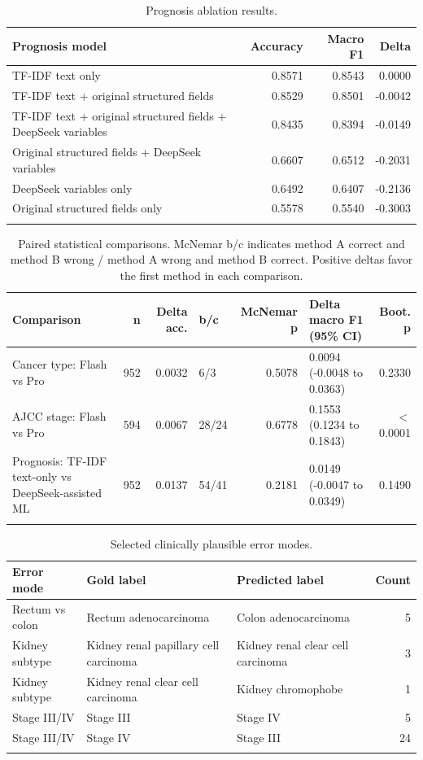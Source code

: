 \documentclass[pdflatex,sn-vancouver-num]{sn-jnl}
\begin{document}
\begin{table}[htbp]
\caption{Prognosis ablation results.}\label{tab:prognosis}
\small
\begin{tabular}{@{}p{7.0cm}r r r@{}}
\toprule
Prognosis model & Accuracy & Macro F1 & Delta \\
\midrule
TF-IDF text only & 0.8571 & 0.8543 & 0.0000 \\
TF-IDF text + original structured fields & 0.8529 & 0.8501 & -0.0042 \\
TF-IDF text + original structured fields + DeepSeek variables & 0.8435 & 0.8394 & -0.0149 \\
Original structured fields + DeepSeek variables & 0.6607 & 0.6512 & -0.2031 \\
DeepSeek variables only & 0.6492 & 0.6407 & -0.2136 \\
Original structured fields only & 0.5578 & 0.5540 & -0.3003 \\
\botrule
\end{tabular}
\end{table}

\begin{table}[htbp]
\caption{Paired statistical comparisons. McNemar b/c indicates method A correct and method B wrong / method A wrong and method B correct. Positive deltas favor the first method in each comparison.}\label{tab:paired}
\small
\begin{tabular}{@{}p{4.8cm}r r p{1.5cm}r p{3.0cm}r@{}}
\toprule
Comparison & n & Delta acc. & b/c & McNemar p & Delta macro F1 (95\% CI) & Boot. p \\
\midrule
Cancer type: Flash vs Pro & 952 & 0.0032 & 6/3 & 0.5078 & 0.0094 (-0.0048 to 0.0363) & 0.2330 \\
AJCC stage: Flash vs Pro & 594 & 0.0067 & 28/24 & 0.6778 & 0.1553 (0.1234 to 0.1843) & $<$0.0001 \\
Prognosis: TF-IDF text-only vs DeepSeek-assisted ML & 952 & 0.0137 & 54/41 & 0.2181 & 0.0149 (-0.0047 to 0.0349) & 0.1490 \\
\botrule
\end{tabular}
\end{table}

\begin{table}[htbp]
\caption{Selected clinically plausible error modes.}\label{tab:errors}
\small
\begin{tabular}{@{}p{3.4cm}p{3.7cm}p{3.7cm}r@{}}
\toprule
Error mode & Gold label & Predicted label & Count \\
\midrule
Rectum vs colon & Rectum adenocarcinoma & Colon adenocarcinoma & 5 \\
Kidney subtype & Kidney renal papillary cell carcinoma & Kidney renal clear cell carcinoma & 3 \\
Kidney subtype & Kidney renal clear cell carcinoma & Kidney chromophobe & 1 \\
Stage III/IV & Stage III & Stage IV & 5 \\
Stage III/IV & Stage IV & Stage III & 24 \\
\botrule
\end{tabular}
\end{table}
\end{document}
